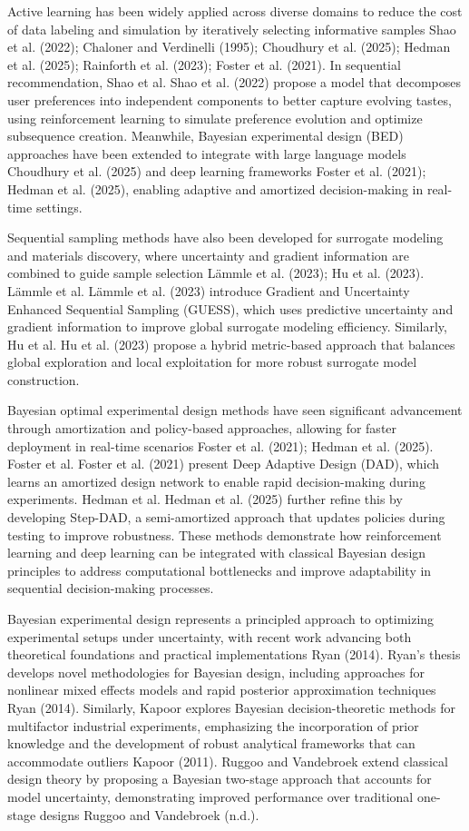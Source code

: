 Active learning has been widely applied across diverse domains to reduce the cost of data labeling and simulation by iteratively selecting informative samples Shao et al. (2022); Chaloner and Verdinelli (1995); Choudhury et al. (2025); Hedman et al. (2025); Rainforth et al. (2023); Foster et al. (2021). In sequential recommendation, Shao et al. Shao et al. (2022) propose a model that decomposes user preferences into independent components to better capture evolving tastes, using reinforcement learning to simulate preference evolution and optimize subsequence creation. Meanwhile, Bayesian experimental design (BED) approaches have been extended to integrate with large language models Choudhury et al. (2025) and deep learning frameworks Foster et al. (2021); Hedman et al. (2025), enabling adaptive and amortized decision-making in real-time settings.

Sequential sampling methods have also been developed for surrogate modeling and materials discovery, where uncertainty and gradient information are combined to guide sample selection Lämmle et al. (2023); Hu et al. (2023). Lämmle et al. Lämmle et al. (2023) introduce Gradient and Uncertainty Enhanced Sequential Sampling (GUESS), which uses predictive uncertainty and gradient information to improve global surrogate modeling efficiency. Similarly, Hu et al. Hu et al. (2023) propose a hybrid metric-based approach that balances global exploration and local exploitation for more robust surrogate model construction.

Bayesian optimal experimental design methods have seen significant advancement through amortization and policy-based approaches, allowing for faster deployment in real-time scenarios Foster et al. (2021); Hedman et al. (2025). Foster et al. Foster et al. (2021) present Deep Adaptive Design (DAD), which learns an amortized design network to enable rapid decision-making during experiments. Hedman et al. Hedman et al. (2025) further refine this by developing Step-DAD, a semi-amortized approach that updates policies during testing to improve robustness. These methods demonstrate how reinforcement learning and deep learning can be integrated with classical Bayesian design principles to address computational bottlenecks and improve adaptability in sequential decision-making processes.

Bayesian experimental design represents a principled approach to optimizing experimental setups under uncertainty, with recent work advancing both theoretical foundations and practical implementations Ryan (2014). Ryan's thesis develops novel methodologies for Bayesian design, including approaches for nonlinear mixed effects models and rapid posterior approximation techniques Ryan (2014). Similarly, Kapoor explores Bayesian decision-theoretic methods for multifactor industrial experiments, emphasizing the incorporation of prior knowledge and the development of robust analytical frameworks that can accommodate outliers Kapoor (2011). Ruggoo and Vandebroek extend classical design theory by proposing a Bayesian two-stage approach that accounts for model uncertainty, demonstrating improved performance over traditional one-stage designs Ruggoo and Vandebroek (n.d.).

